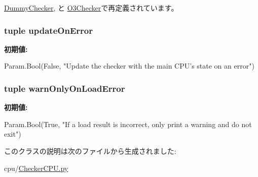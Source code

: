 \hyperlink{classDummyChecker_1_1DummyChecker_acce15679d830831b0bbe8ebc2a60b2ca}{DummyChecker}, と \hyperlink{classO3Checker_1_1O3Checker_acce15679d830831b0bbe8ebc2a60b2ca}{O3Checker}で再定義されています。\hypertarget{classCheckerCPU_1_1CheckerCPU_aad41d3eb2d73f3e7035d73c73bf92523}{
\subsubsection[{updateOnError}]{\setlength{\rightskip}{0pt plus 5cm}tuple {\bf updateOnError}}}
\label{classCheckerCPU_1_1CheckerCPU_aad41d3eb2d73f3e7035d73c73bf92523}
{\bfseries 初期値:}
\begin{DoxyCode}
Param.Bool(False,
        "Update the checker with the main CPU's state on an error")
\end{DoxyCode}
\hypertarget{classCheckerCPU_1_1CheckerCPU_a2c725933b14b9d3c867f1ab31a36274e}{
\subsubsection[{warnOnlyOnLoadError}]{\setlength{\rightskip}{0pt plus 5cm}tuple {\bf warnOnlyOnLoadError}}}
\label{classCheckerCPU_1_1CheckerCPU_a2c725933b14b9d3c867f1ab31a36274e}
{\bfseries 初期値:}
\begin{DoxyCode}
Param.Bool(True,
        "If a load result is incorrect, only print a warning and do not exit")
\end{DoxyCode}


このクラスの説明は次のファイルから生成されました:\begin{DoxyCompactItemize}
\item 
cpu/\hyperlink{CheckerCPU_8py}{CheckerCPU.py}\end{DoxyCompactItemize}
